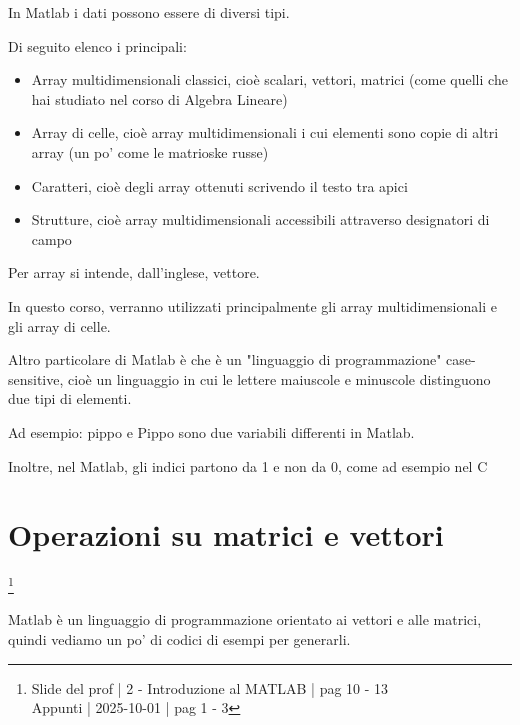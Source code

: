 In Matlab i dati possono essere di diversi tipi. \newline 

Di seguito elenco i principali: 

\begin{itemize}
    \item Array multidimensionali classici, cioè scalari, vettori, matrici (come quelli che hai studiato nel corso di Algebra Lineare) 
    \item Array di celle, cioè array multidimensionali i cui elementi sono copie di altri array (un po' come le matrioske russe) 
    \item Caratteri, cioè degli array ottenuti scrivendo il testo tra apici 
    \item Strutture, cioè array multidimensionali accessibili attraverso designatori di campo  
\end{itemize}


\begin{tcolorbox}
    Per array si intende, dall'inglese, vettore. \newline 

    In questo corso, verranno utilizzati principalmente gli array multidimensionali e gli array di celle. \newline 

    Altro particolare di Matlab è che è un "linguaggio di programmazione" case-sensitive, cioè un linguaggio in cui le lettere maiuscole e minuscole distinguono due tipi di elementi. \newline 

    Ad esempio: pippo e Pippo sono due variabili differenti in Matlab. \newline 

    Inoltre, nel Matlab, gli indici partono da 1 e non da 0, come ad esempio nel C
\end{tcolorbox} 

\newpage 

\section{Operazioni su matrici e vettori}

\footnote{ 
    Slide del prof | 2 - Introduzione al MATLAB | pag 10 - 13\\
    Appunti | 2025-10-01 | pag 1 - 3 
}

Matlab è un linguaggio di programmazione orientato ai vettori e alle matrici, quindi vediamo un po' di codici di esempi per generarli. \newline 

